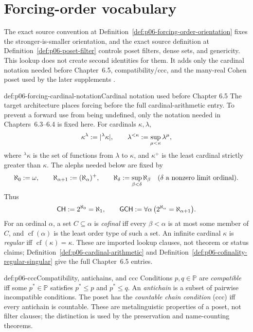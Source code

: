 
\section{Forcing-order vocabulary}
\label{sec:p06-forcing-vocabulary}

The exact source convention at
Definition~\ref{def:p06-forcing-order-orientation} fixes the
stronger-is-smaller orientation, and the exact source definition at
Definition~\ref{def:p06-poset-filter} controls poset filters, dense sets, and
genericity.  This lookup does not create second identities for them.  It adds
only the cardinal notation needed before Chapter~6.5, compatibility/ccc, and
the many-real Cohen poset used by the later supplements
\cite[pp.~201--224]{Jech2003}.

\begin{hbconvention}{def:p06-forcing-cardinal-notation}{Cardinal notation used before Chapter 6.5}
The target architecture places forcing before the full cardinal-arithmetic
entry.  To prevent a forward use from being undefined, only the notation
needed in Chapters~6.3--6.4 is fixed here.  For cardinals
\(\kappa,\lambda\),
\[
  \kappa^\lambda\mathrel{:=}\lvert{}^{\lambda}\kappa\rvert,
  \qquad
  \lambda^{<\kappa}\mathrel{:=}
    \sup_{\mu<\kappa}\lambda^\mu,
\]
where \({}^{\lambda}\kappa\) is the set of functions from \(\lambda\) to
\(\kappa\), and \(\kappa^+\) is the least cardinal strictly greater than
\(\kappa\).  The alephs needed below are fixed by
\[
  \aleph_0\mathrel{:=}\omega,
  \qquad
  \aleph_{\alpha+1}\mathrel{:=}(\aleph_\alpha)^+,
  \qquad
  \aleph_\delta\mathrel{:=}\sup_{\beta<\delta}\aleph_\beta
  \quad(\delta\text{ a nonzero limit ordinal}).
\]
Thus
\[
  \mathsf{CH}\mathrel{:=}2^{\aleph_0}=\aleph_1,
  \qquad
  \mathsf{GCH}\mathrel{:=}
    \forall\alpha\,\bigl(2^{\aleph_\alpha}=\aleph_{\alpha+1}\bigr).
\]
For an ordinal \(\alpha\), a set \(C\subseteq\alpha\) is
\emph{cofinal} iff every \(\beta<\alpha\) is at most some member of \(C\),
and \(\operatorname{cf}(\alpha)\) is the least order type of such a set.
An infinite cardinal \(\kappa\) is \emph{regular} iff
\(\operatorname{cf}(\kappa)=\kappa\).  These are imported lookup clauses,
not theorem or status claims; Definition~\ref{def:p06-cardinal-arithmetic}
and Definition~\ref{def:p06-cofinality-regular-singular} give the full
Chapter~6.5 entries.
\end{hbconvention}

\begin{hbdefinition}{def:p06-ccc}{Compatibility, antichains, and ccc}
Conditions \(p,q\in\mathbb P\) are \emph{compatible} iff some
\(p^\ast\in\mathbb P\) satisfies \(p^\ast\leq p\) and \(p^\ast\leq q\).  An
\emph{antichain} is a subset of pairwise incompatible conditions.  The poset
has the \emph{countable chain condition} (ccc) iff every antichain is
countable.  These are metalinguistic properties of a poset, not filter clauses;
the distinction is used by the preservation and name-counting theorems.
\end{hbdefinition}

